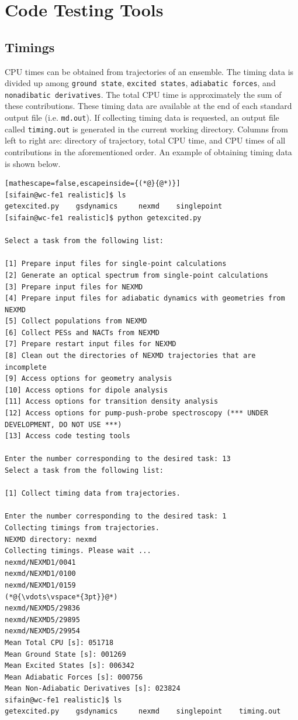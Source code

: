 \documentclass[letterpaper,12pt,titlepage]{article}
\begin{document}
\newpage
\section{Code Testing Tools}

\subsection{Timings}
CPU times can be obtained from trajectories of an ensemble.  The timing data is divided up among \verb+ground state+, \verb+excited states+, \verb+adiabatic forces+, and \verb+nonadibatic derivatives+.  The total CPU time is approximately the sum of these contributions.  These timing data are available at the end of each standard output file (i.e. \verb+md.out+).  If collecting timing data is requested, an output file called \verb+timing.out+ is generated in the current working directory.  Columns from left to right are: directory of trajectory, total CPU time, and CPU times of all contributions in the aforementioned order.  An example of obtaining timing data is shown below.

\begin{lstlisting}[mathescape=false,escapeinside={(*@}{@*)}]
[sifain@wc-fe1 realistic]$ ls
getexcited.py    gsdynamics     nexmd    singlepoint
[sifain@wc-fe1 realistic]$ python getexcited.py 

Select a task from the following list:

[1] Prepare input files for single-point calculations
[2] Generate an optical spectrum from single-point calculations
[3] Prepare input files for NEXMD
[4] Prepare input files for adiabatic dynamics with geometries from NEXMD
[5] Collect populations from NEXMD
[6] Collect PESs and NACTs from NEXMD
[7] Prepare restart input files for NEXMD
[8] Clean out the directories of NEXMD trajectories that are incomplete
[9] Access options for geometry analysis
[10] Access options for dipole analysis
[11] Access options for transition density analysis
[12] Access options for pump-push-probe spectroscopy (*** UNDER DEVELOPMENT, DO NOT USE ***)
[13] Access code testing tools

Enter the number corresponding to the desired task: 13
Select a task from the following list:

[1] Collect timing data from trajectories.

Enter the number corresponding to the desired task: 1
Collecting timings from trajectories.
NEXMD directory: nexmd
Collecting timings. Please wait ...
nexmd/NEXMD1/0041
nexmd/NEXMD1/0100
nexmd/NEXMD1/0159
(*@{\vdots\vspace*{3pt}}@*)
nexmd/NEXMD5/29836
nexmd/NEXMD5/29895
nexmd/NEXMD5/29954
Mean Total CPU [s]: 051718
Mean Ground State [s]: 001269
Mean Excited States [s]: 006342
Mean Adiabatic Forces [s]: 000756
Mean Non-Adiabatic Derivatives [s]: 023824
sifain@wc-fe1 realistic]$ ls
getexcited.py    gsdynamics     nexmd    singlepoint    timing.out
\end{lstlisting}
\end{document}
